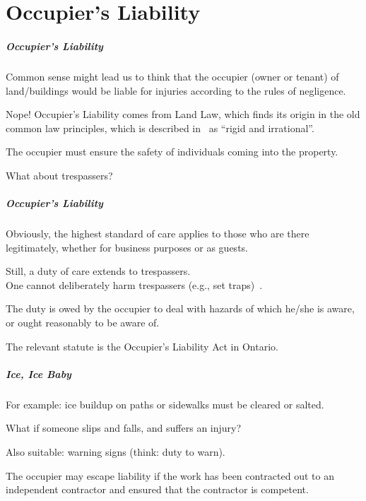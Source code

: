 \part{Occupier's Liability}

\begin{frame}
\partpage
\end{frame}



\begin{frame}
\frametitle{Occupier's Liability}

Common sense might lead us to think that the occupier (owner or tenant) of land/buildings would be liable for injuries according to the rules of negligence.

Nope! Occupier's Liability comes from Land Law, which finds its origin in the old common law principles, which is described in~\cite{lba} as ``rigid and irrational''.

The occupier must ensure the safety of individuals coming into the property. 

What about trespassers?

\end{frame}



\begin{frame}
\frametitle{Occupier's Liability}

Obviously, the highest standard of care applies to those who are there legitimately, whether for business purposes or as guests.

Still, a duty of care extends to trespassers.\\
\quad One cannot deliberately harm trespassers (e.g., set traps)~\cite{lpe}. 

The duty is owed by the occupier to deal with hazards of which he/she is aware, or ought reasonably to be aware of.

The relevant statute is the Occupier's Liability Act in Ontario.

\end{frame}



\begin{frame}
\frametitle{Ice, Ice Baby}

For example: ice buildup on paths or sidewalks must be cleared or salted.

What if someone slips and falls, and suffers an injury?

Also suitable: warning signs (think: duty to warn).

The occupier may escape liability if the work has been contracted out to an independent contractor and ensured that the contractor is competent.


\end{frame}


